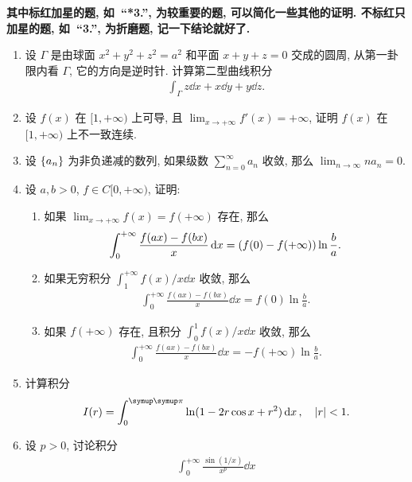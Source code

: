 \documentclass{ctexart}
\let\umathpi\pi
\renewcommand\pi{\symup\umathpi}%
\let\set\qty
\newcommand{\limit}[2]{\lim_{#1 \to #2}}
\begin{document}
{\bfseries 其中标红加星的题, 如\  ``{\bfseries\color{red}*3.}'',  为较重要的题, 可以简化一些其他的证明. 不标红只加星的题, 如\ ``{\bfseries*3.}'', 为折磨题, 记一下结论就好了.}
\begin{enumerate}[series=exer]
    \item 设 $ \Gamma $ 是由球面 $ x^{2} + y^{2} + z^{2} = a^{2} $ 和平面 $ x + y + z = 0 $ 交成的圆周, 从第一卦限内看 $ \Gamma $, 它的方向是逆时针. 计算第二型曲线积分
    \begin{align*}
        \int_{\Gamma} z \dd{x} + x \dd{y} + y \dd{z}.
    \end{align*}
    \item 设 $ f(x) $ 在 $ [1, +\infty) $ 上可导, 且 $ \limit{x}{+\infty}f'(x) = +\infty $, 证明 $ f(x) $ 在 $ [1, +\infty) $ 上不一致连续.
    \item 设 $ \set{a_{n}} $ 为非负递减的数列, 如果级数 $ \sum_{n=0}^{\infty}a_{n} $ 收敛, 那么 $ \limit{n}{\infty} na_{n} = 0 $. 
    \item 设 $ a, b > 0 $, $ f \in C[0, +\infty) $, 证明:
    \begin{enumerate}
        \item  如果 $ \limit{x}{+\infty}f(x) = f(+\infty) $ 存在, 那么
        \begin{align*}
            \int_{0}^{+\infty} \frac{f(ax) - f(bx)}{x} \dd{x} = \qty(f(0) - f(+\infty))\ln\frac{b}{a}.
        \end{align*}
        \item 如果无穷积分 $ \int_{1}^{+\infty} f(x)/x \dd{x} $ 收敛, 那么
        \begin{align*}
            \int_{0}^{+\infty} \frac{f(ax) - f(bx)}{x} \dd{x} = f(0)\ln\frac{b}{a}.
        \end{align*}
        \item 如果 $ f(+\infty) $ 存在, 且积分 $ \int_{0}^{1} f(x)/x \dd{x} $ 收敛, 那么
        \begin{align*}
            \int_{0}^{+\infty} \frac{f(ax) - f(bx)}{x} \dd{x} = - f(+\infty)\ln\frac{b}{a}.
        \end{align*}
    \end{enumerate}
    \item 计算积分
    \begin{align*}
        I(r) = \int_{0}^{\pi} \ln(1 - 2 r \cos x + r^{2}) \dd{x}, \quad \abs{r} <1.
    \end{align*}
    \item 设 $ p > 0 $, 讨论积分
    \begin{align*}
        \int_{0}^{+\infty} \frac{\sin(1/x)}{x^{p}} \dd{x}

\end{align*}
\end{enumerate}
\end{document}
